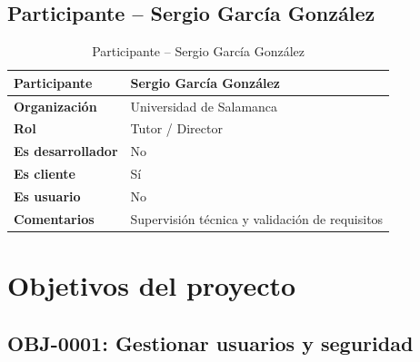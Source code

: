 \documentclass[11pt, a4paper]{article}
\begin{document}
\subsection{Participante -- Sergio García González}

\begin{table}[H]
    \centering
    \small
    \begin{tabular}{|p{4cm}|p{10cm}|}
    \hline
    \textbf{Participante} & Sergio García González \\
    \hline
    \textbf{Organización} & Universidad de Salamanca \\
    \hline
    \textbf{Rol} & Tutor / Director \\
    \hline
    \textbf{Es desarrollador} & No \\
    \hline
    \textbf{Es cliente} & Sí \\
    \hline
    \textbf{Es usuario} & No \\
    \hline
    \textbf{Comentarios} & Supervisión técnica y validación de requisitos \\
    \hline
    \end{tabular}
    \caption{Participante -- Sergio García González}
\end{table}

\section{Objetivos del proyecto}

\subsection{OBJ-0001: Gestionar usuarios y seguridad}
\end{document}
